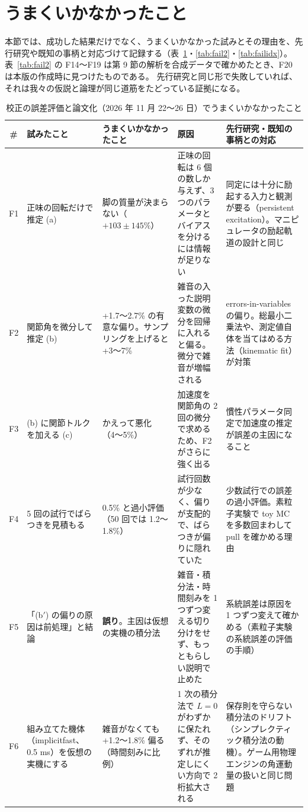 \documentclass[paper=a4paper,fontsize=10pt,twocolumn,column_gap=2zw,line_length=24zw,number_of_lines=46,head_space=20mm]{jlreq}
\begin{document}
\section{うまくいかなかったこと}

本節では、成功した結果だけでなく、うまくいかなかった試みとその理由を、先行研究や既知の事柄と対応づけて記録する（表~\ref{tab:fail}・\ref{tab:fail2}・\ref{tab:failidx}）。
表~\ref{tab:fail2} の F14〜F19 は第 9 節の解析を合成データで確かめたとき、F20 は本版の作成時に見つけたものである。
先行研究と同じ形で失敗していれば、それは我々の仮説と論理が同じ道筋をたどっている証拠になる。

\begin{table}[t]\centering\footnotesize
\caption{校正の誤差評価と論文化（2026 年 11 月 22〜26 日）でうまくいかなかったこと}\label{tab:fail}
\setlength{\tabcolsep}{3pt}
\begin{tabular}{cp{}p{}p{}p{}}\toprule
\# & 試みたこと & うまくいかなかったこと & 原因 & 先行研究・既知の事柄との対応 \\\midrule
F1 & 正味の回転だけで推定 (a) & 脚の質量が決まらない（$+103\pm145\%$） & 正味の回転は 6 個の数しか与えず、3 つのパラメータとバイアスを分けるには情報が足りない & 同定には十分に励起する入力と観測が要る（persistent excitation）。マニピュレータの励起軌道の設計と同じ \\
F2 & 関節角を微分して推定 (b) & +1.7〜2.7\% の有意な偏り。サンプリングを上げると +3〜7\% & 雑音の入った説明変数の微分を回帰に入れると偏る。微分で雑音が増幅される & errors-in-variables の偏り。総最小二乗法や、測定値自体を当てはめる方法（kinematic fit）が対策 \\
F3 & (b) に関節トルクを加える (c) & かえって悪化（4〜5\%） & 加速度を関節角の 2 回の微分で求めるため、F2 がさらに強く出る & 慣性パラメータ同定で加速度の推定が誤差の主因になること \cite{atkeson1986} \\
F4 & 5 回の試行でばらつきを見積もる & 0.5\% と過小評価（50 回では 1.2〜1.8\%） & 試行回数が少なく、偏りが支配的で、ばらつきが偏りに隠れていた & 少数試行での誤差の過小評価。素粒子実験で toy MC を多数回まわして pull を確かめる理由 \\
F5 & 「(b$'$) の偏りの原因は前処理」と結論 & \textbf{誤り}。主因は仮想の実機の積分法 & 雑音・積分法・時間刻みを 1 つずつ変える切り分けをせず、もっともらしい説明で止めた & 系統誤差は原因を 1 つずつ変えて確かめる（素粒子実験の系統誤差の評価の手順） \\
F6 & 組み立てた機体（implicitfast、0.5 ms）を仮想の実機にする & 雑音がなくても +1.2〜1.8\% 偏る（時間刻みに比例） & 1 次の積分法で $L=0$ がわずかに保たれず、そのずれが推定しにくい方向で 2 桁拡大される & 保存則を守らない積分法のドリフト（シンプレクティック積分法の動機）。ゲーム用物理エンジンの角運動量の扱いと同じ問題 \\

\end{tabular}
\end{table}
\end{document}
